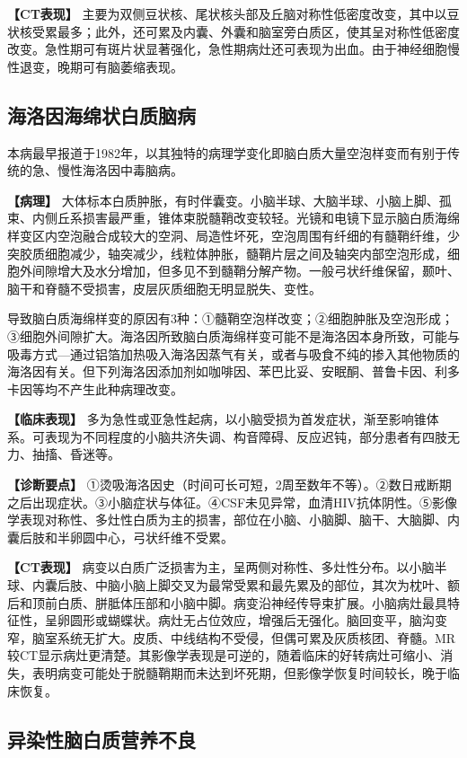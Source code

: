 \textbf{【CT表现】}
主要为双侧豆状核、尾状核头部及丘脑对称性低密度改变，其中以豆状核受累最多；此外，还可累及内囊、外囊和脑室旁白质区，使其呈对称性低密度改变。急性期可有斑片状显著强化，急性期病灶还可表现为出血。由于神经细胞慢性退变，晚期可有脑萎缩表现。

\subsection{海洛因海绵状白质脑病}

本病最早报道于1982年，以其独特的病理学变化即脑白质大量空泡样变而有别于传统的急、慢性海洛因中毒脑病。

\textbf{【病理】}
大体标本白质肿胀，有时伴囊变。小脑半球、大脑半球、小脑上脚、孤束、内侧丘系损害最严重，锥体束脱髓鞘改变较轻。光镜和电镜下显示脑白质海绵样变区内空泡融合成较大的空洞、局造性坏死，空泡周围有纤细的有髓鞘纤维，少突胶质细胞减少，轴突减少，线粒体肿胀，髓鞘片层之间及轴突内部空泡形成，细胞外间隙增大及水分增加，但多见不到髓鞘分解产物。一般弓状纤维保留，颞叶、脑干和脊髓不受损害，皮层灰质细胞无明显脱失、变性。

导致脑白质海绵样变的原因有3种：①髓鞘空泡样改变；②细胞肿胀及空泡形成；③细胞外间隙扩大。海洛因所致脑白质海绵样变可能不是海洛因本身所致，可能与吸毒方式---通过铝箔加热吸入海洛因蒸气有关，或者与吸食不纯的掺入其他物质的海洛因有关。但下列海洛因添加剂如咖啡因、苯巴比妥、安眠酮、普鲁卡因、利多卡因等均不产生此种病理改变。

\textbf{【临床表现】}
多为急性或亚急性起病，以小脑受损为首发症状，渐至影响锥体系。可表现为不同程度的小脑共济失调、构音障碍、反应迟钝，部分患者有四肢无力、抽搐、昏迷等。

\textbf{【诊断要点】}
①烫吸海洛因史（时间可长可短，2周至数年不等）。②数日戒断期之后出现症状。③小脑症状与体征。④CSF未见异常，血清HIV抗体阴性。⑤影像学表现对称性、多灶性白质为主的损害，部位在小脑、小脑脚、脑干、大脑脚、内囊后肢和半卵圆中心，弓状纤维不受累。

\textbf{【CT表现】}
病变以白质广泛损害为主，呈两侧对称性、多灶性分布。以小脑半球、内囊后肢、中脑小脑上脚交叉为最常受累和最先累及的部位，其次为枕叶、额后和顶前白质、胼胝体压部和小脑中脚。病变沿神经传导束扩展。小脑病灶最具特征性，呈卵圆形或蝴蝶状。病灶无占位效应，增强后无强化。脑回变平，脑沟变窄，脑室系统无扩大。皮质、中线结构不受侵，但偶可累及灰质核团、脊髓。MR较CT显示病灶更清楚。其影像学表现是可逆的，随着临床的好转病灶可缩小、消失，表明病变可能处于脱髓鞘期而未达到坏死期，但影像学恢复时间较长，晚于临床恢复。

\subsection{异染性脑白质营养不良}

